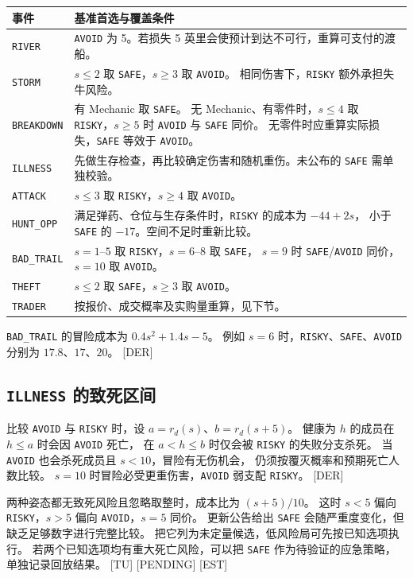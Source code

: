 \documentclass[UTF8,11pt,a4paper]{ctexart}
\newcommand{\src}[1]{\textup{\small\textcolor{muted}{[#1]}}}
\newcommand{\api}[1]{\texttt{#1}}
\begin{document}
\begin{center}\small
\begin{tabularx}{\linewidth}{@{}L{2.65cm}Y@{}}
\toprule
事件 & 基准首选与覆盖条件 \\
\midrule
\api{RIVER} & \api{AVOID} 为 5。若损失 5 英里会使预计到达不可行，重算可支付的渡船。 \\
\api{STORM} & $s\le2$ 取 \api{SAFE}，$s\ge3$ 取 \api{AVOID}。
相同伤害下，\api{RISKY} 额外承担失牛风险。 \\
\api{BREAKDOWN} & 有 Mechanic 取 \api{SAFE}。
无 Mechanic、有零件时，$s\le4$ 取 \api{RISKY}，$s\ge5$ 时 \api{AVOID} 与 \api{SAFE} 同价。
无零件时应重算实际损失，\api{SAFE} 等效于 \api{AVOID}。 \\
\api{ILLNESS} & 先做生存检查，再比较确定伤害和随机重伤。未公布的 \api{SAFE} 需单独校验。 \\
\api{ATTACK} & $s\le3$ 取 \api{RISKY}，$s\ge4$ 取 \api{AVOID}。 \\
\api{HUNT\_OPP} & 满足弹药、仓位与生存条件时，\api{RISKY} 的成本为 $-44+2s$，
小于 \api{SAFE} 的 $-17$。空间不足时重新比较。 \\
\api{BAD\_TRAIL} & $s=1$--$5$ 取 \api{RISKY}，$s=6$--$8$ 取 \api{SAFE}，
$s=9$ 时 \api{SAFE}/\api{AVOID} 同价，$s=10$ 取 \api{AVOID}。 \\
\api{THEFT} & $s\le2$ 取 \api{SAFE}，$s\ge3$ 取 \api{AVOID}。 \\
\api{TRADER} & 按报价、成交概率及实购量重算，见下节。 \\
\bottomrule
\end{tabularx}
\end{center}

\noindent \api{BAD\_TRAIL} 的冒险成本为 $0.4s^2+1.4s-5$。
例如 $s=6$ 时，\api{RISKY}、\api{SAFE}、\api{AVOID} 分别为 $17.8$、$17$、$20$。 \src{DER}

\subsection{\texorpdfstring{\api{ILLNESS}}{ILLNESS} 的致死区间}

比较 \api{AVOID} 与 \api{RISKY} 时，设 $a=r_d(s)$、$b=r_d(s+5)$。
健康为 $h$ 的成员在 $h\le a$ 时会因 \api{AVOID} 死亡，
在 $a<h\le b$ 时仅会被 \api{RISKY} 的失败分支杀死。
当 \api{AVOID} 也会杀死成员且 $s<10$，冒险有无伤机会，
仍须按覆灭概率和预期死亡人数比较。
$s=10$ 时冒险必受更重伤害，\api{AVOID} 弱支配 \api{RISKY}。 \src{DER}

两种姿态都无致死风险且忽略取整时，成本比为 $(s+5)/10$。
这时 $s<5$ 偏向 \api{RISKY}，$s>5$ 偏向 \api{AVOID}，$s=5$ 同价。
更新公告给出 \api{SAFE} 会随严重度变化，但缺乏足够数字进行完整比较。
把它列为未定量候选，低风险局可先按已知选项执行。
若两个已知选项均有重大死亡风险，可以把 \api{SAFE} 作为待验证的应急策略，
单独记录回放结果。 \src{TU} \src{PENDING} \src{EST}
\end{document}
